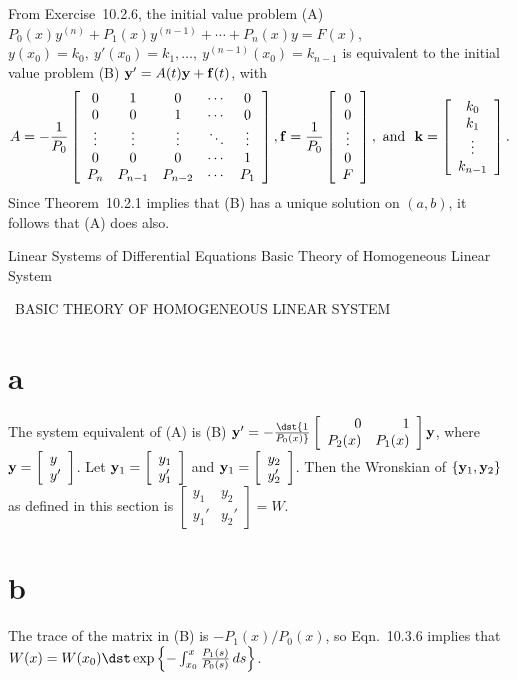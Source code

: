 \documentclass[dvips]{book}
\renewcommand{\exer}[1]{\par\medskip\;\noindent{\color{red}\bf #1.}}
\numberwithin{example}{section}
\numberwithin{equation}{section}
\numberwithin{theorem}{section}
\numberwithin{table}{section}
\numberwithin{figure}{section}
\newcommand{\twocol}[2]{\left[\begin{array}{l}#1\\#2\end{array}\right]}
\newcommand{\twobytwo}[4]{\left[\begin{array}{rr}
#1&#2\\#3&#4\end{array}\right]}
\begin{document}
\exer{10.2.12}
From Exercise~10.2.6, the initial value problem
(A) $P_0(x)y^{(n)}+P_1(x)y^{(n-1)}+\cdots+P_n(x)y=F(x)$,
$y(x_0)=k_0,\ y'(x_0)=k_1,\dots,\ y^{(n-1)}(x_0)=k_{n-1}$ is
equivalent to the initial value problem (B) ${\bf y'}=A(t){\bf y}+{\bf
f}(t)$, with
$$A=-{1\over P_0}
\left[\begin{array}{ccccc}
0&1&0&\cdots&0\\
0&0&1&\cdots&0\\
\vdots&\vdots&\vdots&\ddots&\vdots\\
0&0&0&\cdots&1\\
P_n&P_{n-1}&P_{n-2}&\cdots&P_1
\end{array}\right],
{\bf f}={1\over P_0}
\left[\begin{array}{c}
0\\ 0\\\vdots\\0\\F
\end{array}\right],
\mbox{\ and \ }
{\bf k}=
\left[\begin{array}{c}
k_0\\k_1\\\vdots\\k_{n-1}
\end{array}\right].
$$
Since Theorem~10.2.1 implies that (B) has a unique solution on
$(a,b)$, it follows that (A) does also.


 {Linear Systems of Differential  Equations}
{Basic Theory of Homogeneous Linear System}

\renewcommand{\thissection}{\sectiontitle
{\, BASIC THEORY OF HOMOGENEOUS LINEAR SYSTEM}}
\thissection

      \vspace*{-17.5pt}

\exer{10.3.2}
\part{a}
The system equivalent of (A) is (B) ${\bf
y}'=-\dst{1\over P_0(x)}\twobytwo01{P_2(x)}{P_1(x)}{\bf y}$, where
${\bf y}=\twocol{y}{y'}$. Let ${\bf y}_1=\twocol{y_1}{y_1'}$ and
 ${\bf y}_1=\twocol{y_2}{y_2'}$. Then the Wronskian of $\{{\bf
y}_1,{\bf y}_2\}$ as defined in this section is
$\twobytwo{y_1}{y_2}{y_1'}{y_2'}=W$.

\part{b}
The trace of the matrix in (B) is $-P_1(x)/P_0(x)$, so Eqn.~10.3.6 implies
that
$W(x)=W(x_0)\dst\exp\left\{-\int^x_{x_0}{P_1(s)\over P_0(s)}\,
ds\right\}$.
\end{document}
